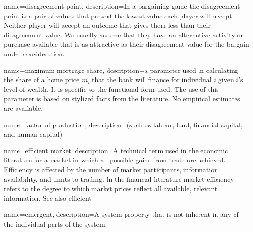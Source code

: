 
{
name=disagreement point,
description={In a bargaining game the disagreement point is a pair of values that present the lowest value each player will accept. Neither player will accept an outcome that gives them less than their disagreement value. We usually assume that they have an alternative activity or purchase available that is as attractive as their disagreement value for the bargain under consideration.}
}


{
name=maximum mortgage share,
description={a parameter used in calculating the share of a home price $m_i$ that the bank will finance for individual $i$ given $i$'s level of wealth. It is specific to the functional form used. The use of this parameter is based on stylized facts from the literature.  No empirical estimates are available.}
}

{
name=factor of production,
description={(such as labour, land, financial capital,  and human capital)}
}


{
name=efficient market,
description={A technical term used in the economic literature for a market in which all possible gains from trade are achieved. Efficiency is affected by the number of market participants, information availability, and limits to trading. In the financial literature market efficiency refers to the degree to which market prices reflect all available, relevant information. See also \gls{efficient}} %
}



{
name=emergent,
description={A system property that is not inherent in any of the individual parts of the system. %
}
}

